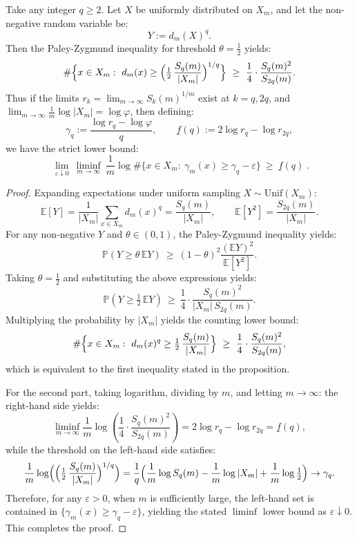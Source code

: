 \begin{proposition}\label{prop:pom-spectrum-pz-lower}
Take any integer $q\ge 2$. Let $X$ be uniformly distributed on $X_m$, and let the non-negative random variable be:
\[
Y:=d_m(X)^q.
\]
Then the Paley-Zygmund inequality for threshold $\theta=\tfrac12$ yields:
\[
\#\Bigl\{x\in X_m:\ d_m(x)\ge \Bigl(\tfrac12\,\frac{S_q(m)}{|X_m|}\Bigr)^{1/q}\Bigr\}
\ \ge\ \frac14\cdot\frac{S_q(m)^2}{S_{2q}(m)}.
\]
Thus if the limits $r_k=\lim_{m\to\infty}S_k(m)^{1/m}$ exist at $k=q,2q$, and $\lim_{m\to\infty}\frac1m\log|X_m|=\log\varphi$, then defining:
\[
\gamma_q:=\frac{\log r_q-\log\varphi}{q},
\qquad
\underline f(q):=2\log r_q-\log r_{2q},
\]
we have the strict lower bound:
\[
\boxed{\;
\lim_{\varepsilon\downarrow 0}\ \liminf_{m\to\infty}\ \frac1m
\log \#\bigl\{x\in X_m:\ \gamma_m(x)\ge \gamma_q-\varepsilon\bigr\}
\ \ge\ \underline f(q)\; }.
\]
\end{proposition}
\begin{proof}
Expanding expectations under uniform sampling $X\sim \mathrm{Unif}(X_m)$:
\[
\mathbb{E}[Y]=\frac{1}{|X_m|}\sum_{x\in X_m}d_m(x)^q=\frac{S_q(m)}{|X_m|},
\qquad
\mathbb{E}[Y^2]=\frac{S_{2q}(m)}{|X_m|}.
\]
For any non-negative $Y$ and $\theta\in(0,1)$, the Paley-Zygmund inequality yields:
\[
\mathbb{P}\!\left(Y\ge \theta\,\mathbb{E}Y\right)\ \ge\ (1-\theta)^2\frac{(\mathbb{E}Y)^2}{\mathbb{E}[Y^2]}.
\]
Taking $\theta=\tfrac12$ and substituting the above expressions yields:
\[
\mathbb{P}\!\left(Y\ge \tfrac12\,\mathbb{E}Y\right)\ \ge\ \frac14\cdot\frac{S_q(m)^2}{|X_m|\,S_{2q}(m)}.
\]
Multiplying the probability by $|X_m|$ yields the counting lower bound:
\[
\#\Bigl\{x\in X_m:\ d_m(x)^q\ge \tfrac12\,\frac{S_q(m)}{|X_m|}\Bigr\}
\ \ge\ \frac14\cdot\frac{S_q(m)^2}{S_{2q}(m)},
\]
which is equivalent to the first inequality stated in the proposition.
\par
For the second part, taking logarithm, dividing by $m$, and letting $m\to\infty$:
the right-hand side yields:
\[
\liminf_{m\to\infty}\frac1m\log\!\left(\frac14\cdot\frac{S_q(m)^2}{S_{2q}(m)}\right)
=2\log r_q-\log r_{2q}=\underline f(q),
\]
while the threshold on the left-hand side satisfies:
\[
\frac1m\log\Bigl(\Bigl(\tfrac12\,\frac{S_q(m)}{|X_m|}\Bigr)^{1/q}\Bigr)
=\frac{1}{q}\Bigl(\frac1m\log S_q(m)-\frac1m\log|X_m|+\frac1m\log\tfrac12\Bigr)
\to \gamma_q.
\]
Therefore, for any $\varepsilon>0$, when $m$ is sufficiently large, the left-hand set is contained in $\{\gamma_m(x)\ge \gamma_q-\varepsilon\}$, yielding the stated $\liminf$ lower bound as $\varepsilon\downarrow 0$. This completes the proof.
\end{proof}

